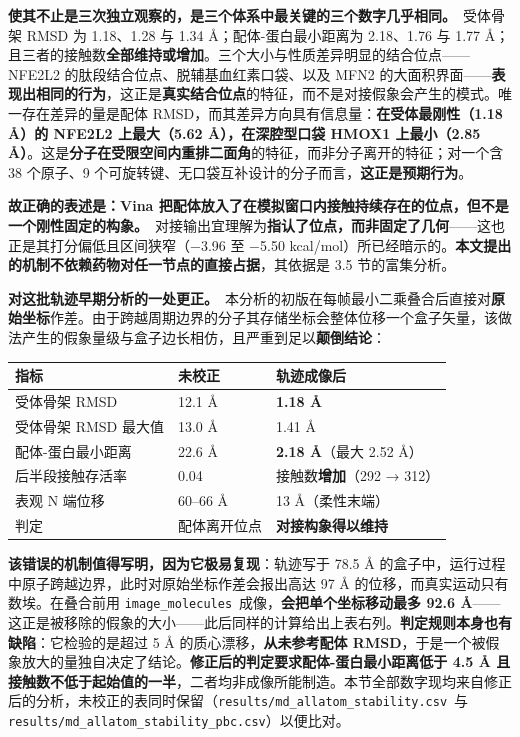 \documentclass[UTF8,fontset=windows,11pt]{ctexart}
\begin{document}
\textbf{使其不止是三次独立观察的，是三个体系中最关键的三个数字几乎相同。}\ 受体骨架 RMSD 为 1.18、1.28 与 1.34 Å；配体-蛋白最小距离为 2.18、1.76 与 1.77 Å；且三者的接触数\textbf{全部维持或增加}。三个大小与性质差异明显的结合位点——NFE2L2 的肽段结合位点、脱辅基血红素口袋、以及 MFN2 的大面积界面——\textbf{表现出相同的行为}，这正是\textbf{真实结合位点}的特征，而不是对接假象会产生的模式。唯一存在差异的量是配体 RMSD，而其差异方向具有信息量：\textbf{在受体最刚性（1.18 Å）的 NFE2L2 上最大（5.62 Å），在深腔型口袋 HMOX1 上最小（2.85 Å）}。这是\textbf{分子在受限空间内重排二面角}的特征，而非分子离开的特征；对一个含 38 个原子、9 个可旋转键、无口袋互补设计的分子而言，\textbf{这正是预期行为}。

\textbf{故正确的表述是：Vina 把配体放入了在模拟窗口内接触持续存在的位点，但不是一个刚性固定的构象。}\ 对接输出宜理解为\textbf{指认了位点，而非固定了几何}——这也正是其打分偏低且区间狭窄（−3.96 至 −5.50 kcal/mol）所已经暗示的。\textbf{本文提出的机制不依赖药物对任一节点的直接占据}，其依据是 3.5 节的富集分析。

\textbf{对这批轨迹早期分析的一处更正。}\ 本分析的初版在每帧最小二乘叠合后直接对\textbf{原始坐标}作差。由于跨越周期边界的分子其存储坐标会整体位移一个盒子矢量，该做法产生的假象量级与盒子边长相仿，且严重到足以\textbf{颠倒结论}：

\begin{center}
\small
\begin{longtable}{p{}p{}p{}}
\hline
指标 & 未校正 & 轨迹成像后 \\
\hline
受体骨架 RMSD & 12.1 Å & \textbf{1.18 Å} \\
受体骨架 RMSD 最大值 & 13.0 Å & 1.41 Å \\
配体-蛋白最小距离 & 22.6 Å & \textbf{2.18 Å}（最大 2.52 Å） \\
后半段接触存活率 & 0.04 & 接触数\textbf{增加}（292 → 312） \\
表观 N 端位移 & 60–66 Å & 13 Å（柔性末端） \\
判定 & 配体离开位点 & \textbf{对接构象得以维持} \\
\hline
\end{longtable}
\end{center}

\textbf{该错误的机制值得写明，因为它极易复现}：轨迹写于 78.5 Å 的盒子中，运行过程中原子跨越边界，此时对原始坐标作差会报出高达 97 Å 的位移，而真实运动只有数埃。在叠合前用 \texttt{image\_molecules}\ 成像，\textbf{会把单个坐标移动最多 92.6 Å}——这正是被移除的假象的大小——此后同样的计算给出上表右列。\textbf{判定规则本身也有缺陷}：它检验的是超过 5 Å 的质心漂移，\textbf{从未参考配体 RMSD}，于是一个被假象放大的量独自决定了结论。\textbf{修正后的判定要求配体-蛋白最小距离低于 4.5 Å 且接触数不低于起始值的一半}，二者均非成像所能制造。本节全部数字现均来自修正后的分析，未校正的表同时保留（\texttt{results/md\_allatom\_stability.csv}\ 与 \texttt{results/md\_allatom\_stability\_pbc.csv}）以便比对。
\end{document}
